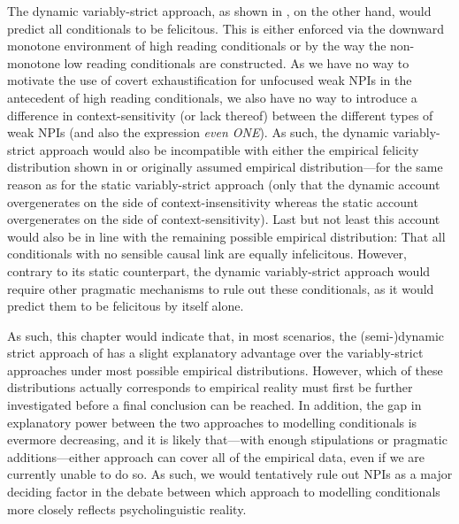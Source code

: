 The dynamic variably-strict approach, as shown in , on the other hand, would predict all conditionals to be felicitous. This is either enforced via the downward monotone environment of high reading conditionals or by the way the non-monotone low reading conditionals are constructed. As we have no way to motivate the use of covert exhaustification for unfocused weak NPIs in the antecedent of high reading conditionals, we also have no way to introduce a difference in context-sensitivity (or lack thereof) between the different types of weak NPIs (and also the expression \textit{even \MakeUppercase{one}}). As such, the dynamic variably-strict approach would also be incompatible with either the empirical felicity distribution shown in  or  originally assumed empirical distribution---for the same reason as for the static variably-strict approach (only that the dynamic account overgenerates on the side of context-insensitivity whereas the static account overgenerates on the side of context-sensitivity). Last but not least this account would also be in line with the remaining possible empirical distribution: That all conditionals with no sensible causal link are equally infelicitous. However, contrary to its static counterpart, the dynamic variably-strict approach would require other pragmatic mechanisms to rule out these conditionals, as it would predict them to be felicitous by itself alone.

As such, this chapter would indicate that, in most scenarios, the (semi-)dynamic strict approach of \textcite{Fintel2001} has a slight explanatory advantage over the variably-strict approaches under most possible empirical distributions. However, which of these distributions actually corresponds to empirical reality must first be further investigated before a final conclusion can be reached. In addition, the gap in explanatory power between the two approaches to modelling conditionals is evermore decreasing, and it is likely that---with enough stipulations or pragmatic additions---either approach can cover all of the empirical data, even if we are currently unable to do so. As such, we would tentatively rule out NPIs as a major deciding factor in the debate between which approach to modelling conditionals more closely reflects psycholinguistic reality.